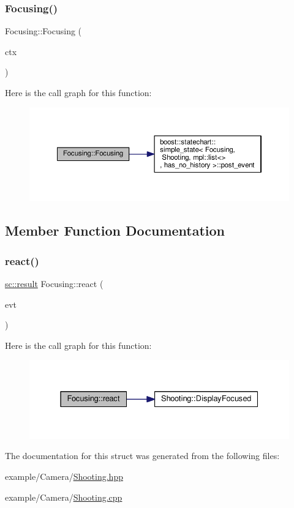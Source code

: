 \subsubsection{\texorpdfstring{Focusing()}{Focusing()}}
{\footnotesize\ttfamily Focusing\+::\+Focusing (\begin{DoxyParamCaption}\item[{my\+\_\+context}]{ctx }\end{DoxyParamCaption})}

Here is the call graph for this function\+:
\nopagebreak
\begin{figure}[H]
\begin{center}
\leavevmode
\includegraphics[width=350pt]{struct_focusing_a2623c5dc706af01284aa77ba229aaa05_cgraph}
\end{center}
\end{figure}


\subsection{Member Function Documentation}
\mbox{\label{struct_focusing_a5d56894eae0a8e06b93779c62b17a15c}} 
\subsubsection{\texorpdfstring{react()}{react()}}
{\footnotesize\ttfamily \mbox{\hyperlink{namespaceboost_1_1statechart_abe807f6598b614d6d87bb951ecd92331}{sc\+::result}} Focusing\+::react (\begin{DoxyParamCaption}\item[{const \mbox{\hyperlink{struct_ev_in_focus}{Ev\+In\+Focus}} \&}]{evt }\end{DoxyParamCaption})}

Here is the call graph for this function\+:
\nopagebreak
\begin{figure}[H]
\begin{center}
\leavevmode
\includegraphics[width=331pt]{struct_focusing_a5d56894eae0a8e06b93779c62b17a15c_cgraph}
\end{center}
\end{figure}


The documentation for this struct was generated from the following files\+:\begin{DoxyCompactItemize}
\item 
example/\+Camera/\mbox{\hyperlink{_shooting_8hpp}{Shooting.\+hpp}}\item 
example/\+Camera/\mbox{\hyperlink{_shooting_8cpp}{Shooting.\+cpp}}\end{DoxyCompactItemize}
